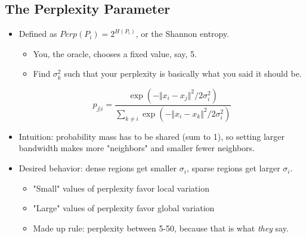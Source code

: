 \documentclass[10pt]{article}
\begin{document}
\subsection*{The Perplexity Parameter}
\begin{itemize}
    \item Defined as $Perp(P_i) = 2^{H(P_i)}$, or the Shannon entropy.
    \begin{itemize}
        \item You, the oracle, chooses a fixed value, say, 5.
        \item Find $\sigma_k^2$ such that your perplexity is basically what you said it should be.
    \end{itemize}
    \[p_{j \vert i} = \frac{\exp(- \Vert x_i - x_j \Vert^2 / 2 \sigma_i^2)}{\sum_{k \neq i} \exp ( - \Vert x_i - x_k \Vert^2 / 2 \sigma_i^2)}\]
    \item Intuition: probability mass has to be shared (sum to 1), so setting larger bandwidth makes more "neighbors" and smaller fewer neighbors.
    \item Desired behavior: dense regions get smaller $\sigma_i$, sparse regions get larger $\sigma_i$.
    \begin{itemize}
        \item "Small" values of perplexity favor local variation
        \item "Large" values of perplexity favor global variation
        \item Made up rule: perplexity between 5-50, because that is what \textit{they} say.
    \end{itemize}
\end{itemize}
\end{document}
